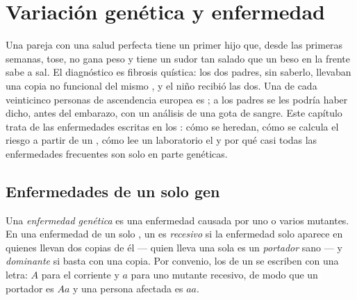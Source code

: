 \chapter{Variación genética y enfermedad}\label{ch:g11:genes-and-disease}

Una pareja con una salud perfecta tiene un primer hijo que, desde las
primeras semanas, tose, no gana peso y tiene un sudor tan salado que un
beso en la frente sabe a sal. El diagnóstico es fibrosis quística: los
dos padres, sin saberlo, llevaban una copia no funcional del mismo ,
y el niño recibió las dos. Una de cada veinticinco personas de
ascendencia europea es ; a los padres se les podría haber
dicho, antes del embarazo, con un análisis de una gota de sangre. Este
capítulo trata de las enfermedades escritas en los : cómo se
heredan, cómo se calcula el riesgo a partir de un ,
cómo lee un laboratorio el  y por qué casi todas las enfermedades
frecuentes son solo en parte genéticas.

\section{Enfermedades de un solo gen}

\begin{definition}\label{def:g11:genes-and-disease:genetic}
Una \emph{enfermedad genética} es una
enfermedad causada por uno o varios  mutantes. En una enfermedad
de un solo , un  es \emph{recesivo} si la
enfermedad solo aparece en quienes llevan dos copias de él --- quien
lleva una sola es un \emph{portador} sano --- y
\emph{dominante} si basta con una copia. Por convenio,
los  de un  se escriben con una letra: $A$ para el 
corriente y $a$ para uno mutante recesivo, de modo que un portador es
$Aa$ y una persona afectada es $aa$.
\end{definition}

